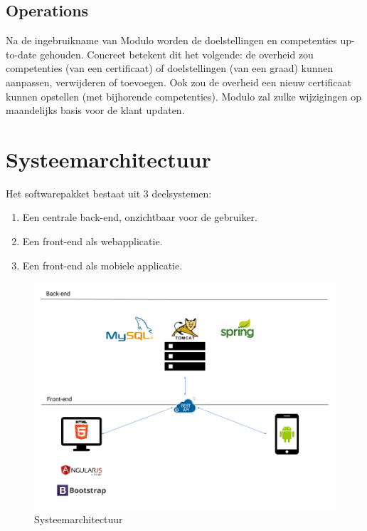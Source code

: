 \documentclass[a4paper]{article}
\begin{document}
\subsection{Operations}
Na de ingebruikname van Modulo worden de doelstellingen en competenties up-to-date gehouden. Concreet betekent dit het volgende: de overheid zou competenties (van een certificaat) of doelstellingen (van een graad) kunnen aanpassen, verwijderen of toevoegen. Ook zou de overheid een nieuw certificaat kunnen opstellen (met bijhorende competenties). Modulo zal zulke wijzigingen op maandelijks basis voor de klant updaten.


\section{Systeemarchitectuur}  \label{sec:systeemarchitectuur} %
Het softwarepakket bestaat uit 3 deelsystemen:

\begin{enumerate}
    \item Een centrale back-end, onzichtbaar voor de gebruiker.
    \item Een front-end als webapplicatie.
    \item Een front-end als mobiele applicatie.
\end{enumerate}

\begin{figure}[H]
  \includegraphics[width=\textwidth]{technologie_stack}
  \caption{Systeemarchitectuur}
  \label{fig:Systeemarchitectuur}
\end{figure}
\end{document}
